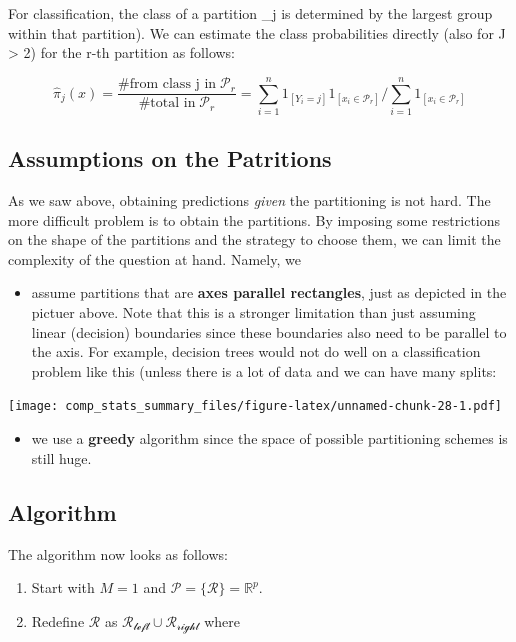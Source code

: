 \documentclass[]{book}
\providecommand{\tightlist}{%
  \setlength{\itemsep}{0pt}\setlength{\parskip}{0pt}}
\begin{document}
For classification, the class of a partition \_j is
determined by the largest group within that partition). We can estimate
the class probabilities directly (also for J \textgreater{} 2) for the
r-th partition as follows:

\[ \hat{\pi}_j(x) =
\frac{\# \text{from class j in}\; \mathcal{P}_r}{\#\text{total in}\; \mathcal{P}_r} = 
\sum\limits_{i = 1}^n 1_{[Y_i = j]} 
1_{[x_i \in \mathcal{P}_r]}/ 
\sum\limits_{i = 1}^n 1_{[x_i \in \mathcal{P}_r]}\]

\subsection{Assumptions on the
Patritions}\label{assumptions-on-the-patritions}

As we saw above, obtaining predictions \emph{given} the partitioning is
not hard. The more difficult problem is to obtain the partitions. By
imposing some restrictions on the shape of the partitions and the
strategy to choose them, we can limit the complexity of the question at
hand. Namely, we

\begin{itemize}
\tightlist
\item
  assume partitions that are \textbf{axes parallel rectangles}, just as
  depicted in the pictuer above. Note that this is a stronger limitation
  than just assuming linear (decision) boundaries since these boundaries
  also need to be parallel to the axis. For example, decision trees
  would not do well on a classification problem like this (unless there
  is a lot of data and we can have many splits:
\end{itemize}

\texttt{[image: comp\_stats\_summary\_files/figure-latex/unnamed-chunk-28-1.pdf]}

\begin{itemize}
\tightlist
\item
  we use a \textbf{greedy} algorithm since the space of possible
  partitioning schemes is still huge.
\end{itemize}

\subsection{Algorithm}\label{algorithm}

The algorithm now looks as follows:

\begin{enumerate}
\def\labelenumi{\arabic{enumi}.}
\tightlist
\item
  Start with \(M = 1\) and
  \(\mathcal{P} = \{\mathcal{R}\} = \mathbb{R}^p\).
\item
  Redefine \(\mathcal{R}\) as
  \(\mathcal{R_{left}} \cup \mathcal{R_{right}}\) where
\end{enumerate}
\end{document}
